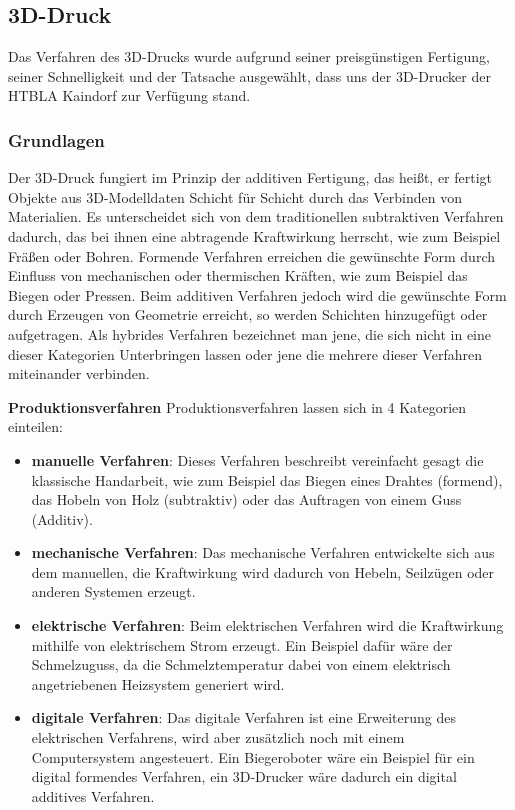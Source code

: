 \subsection{3D-Druck}
Das Verfahren des 3D-Drucks wurde aufgrund seiner preisgünstigen Fertigung, seiner Schnelligkeit und der Tatsache
ausgewählt, dass uns der 3D-Drucker der HTBLA Kaindorf zur Verfügung stand.
\subsubsection{Grundlagen}
Der 3D-Druck fungiert im Prinzip der additiven Fertigung, das heißt, er fertigt Objekte aus 3D-Modelldaten Schicht für Schicht
durch das Verbinden von Materialien. Es unterscheidet sich von dem traditionellen subtraktiven Verfahren dadurch,
das bei ihnen eine abtragende Kraftwirkung herrscht, wie zum Beispiel Fräßen oder Bohren. Formende Verfahren
erreichen die gewünschte Form durch Einfluss von mechanischen oder thermischen Kräften, wie zum Beispiel das Biegen oder
Pressen. Beim additiven  Verfahren jedoch wird die gewünschte Form durch Erzeugen von Geometrie erreicht, so werden Schichten
hinzugefügt oder aufgetragen. Als hybrides Verfahren bezeichnet man jene, die sich nicht in eine dieser Kategorien
Unterbringen lassen oder jene die mehrere dieser Verfahren miteinander verbinden.

\textbf{Produktionsverfahren}
Produktionsverfahren lassen sich in 4 Kategorien einteilen:
\begin{itemize}
    \item \textbf{manuelle Verfahren}: Dieses Verfahren beschreibt vereinfacht gesagt die klassische  Handarbeit, wie zum Beispiel das Biegen eines Drahtes (formend), das Hobeln von Holz (subtraktiv) oder das Auftragen von einem Guss (Additiv).
    \item \textbf{mechanische Verfahren}: Das mechanische Verfahren entwickelte sich aus dem manuellen, die Kraftwirkung wird dadurch von Hebeln, Seilzügen oder anderen Systemen erzeugt.
    \item \textbf{elektrische Verfahren}: Beim elektrischen Verfahren wird die Kraftwirkung mithilfe von elektrischem Strom erzeugt. Ein Beispiel dafür wäre der Schmelzuguss, da die Schmelztemperatur dabei von einem elektrisch angetriebenen Heizsystem generiert wird.
    \item \textbf{digitale Verfahren}: Das digitale Verfahren ist eine Erweiterung des elektrischen Verfahrens, wird aber zusätzlich noch mit einem Computersystem angesteuert. Ein Biegeroboter wäre ein Beispiel für ein digital formendes Verfahren, ein 3D-Drucker wäre dadurch ein digital additives Verfahren.
\end{itemize}

